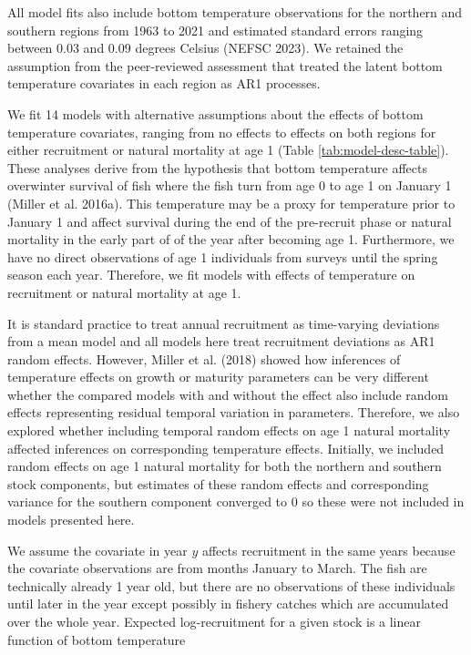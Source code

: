\documentclass[
]{article}
\begin{document}
All model fits also include bottom temperature observations for the
northern and southern regions from 1963 to 2021 and estimated standard
errors ranging between 0.03 and 0.09 degrees Celsius (NEFSC 2023). We
retained the assumption from the peer-reviewed assessment that treated
the latent bottom temperature covariates in each region as AR1
processes.

We fit 14 models with alternative assumptions about the effects of
bottom temperature covariates, ranging from no effects to effects on
both regions for either recruitment or natural mortality at age 1 (Table
\ref{tab:model-desc-table}). These analyses derive from the hypothesis
that bottom temperature affects overwinter survival of fish where the
fish turn from age 0 to age 1 on January 1 (Miller et al. 2016a). This
temperature may be a proxy for temperature prior to January 1 and affect
survival during the end of the pre-recruit phase or natural mortality in
the early part of of the year after becoming age 1. Furthermore, we have
no direct observations of age 1 individuals from surveys until the
spring season each year. Therefore, we fit models with effects of
temperature on recruitment or natural mortality at age 1.

It is standard practice to treat annual recruitment as time-varying
deviations from a mean model and all models here treat recruitment
deviations as AR1 random effects. However, Miller et al. (2018) showed
how inferences of temperature effects on growth or maturity parameters
can be very different whether the compared models with and without the
effect also include random effects representing residual temporal
variation in parameters. Therefore, we also explored whether including
temporal random effects on age 1 natural mortality affected inferences
on corresponding temperature effects. Initially, we included random
effects on age 1 natural mortality for both the northern and southern
stock components, but estimates of these random effects and
corresponding variance for the southern component converged to 0 so
these were not included in models presented here.

We assume the covariate in year \(y\) affects recruitment in the same
years because the covariate observations are from months January to
March. The fish are technically already 1 year old, but there are no
observations of these individuals until later in the year except
possibly in fishery catches which are accumulated over the whole year.
Expected log-recruitment for a given stock is a linear function of
bottom temperature
\end{document}
